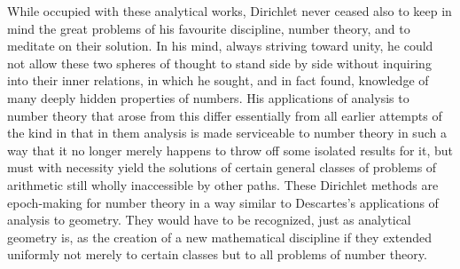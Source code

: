 \documentclass[11pt]{article}
\begin{document}
While occupied with these analytical works, Dirichlet never ceased also to keep in mind the great problems of his favourite discipline, number theory, and to meditate on their solution. In his mind, always striving toward unity, he could not allow these two spheres of thought to stand side by side without inquiring into their inner relations, in which he sought, and in fact found, knowledge of many deeply hidden properties of numbers. His applications of analysis to number theory that arose from this differ essentially from all earlier attempts of the kind in that in them analysis is made serviceable to number theory in such a way that it no longer merely happens to throw off some isolated results for it, but must with necessity yield the solutions of certain general classes of problems of arithmetic still wholly inaccessible by other paths. These Dirichlet methods are epoch-making for number theory in a way similar to Descartes's applications of analysis to geometry. They would have to be recognized, just as analytical geometry is, as the creation of a new mathematical discipline if they extended uniformly not merely to certain classes but to all problems of number theory.
\end{document}
